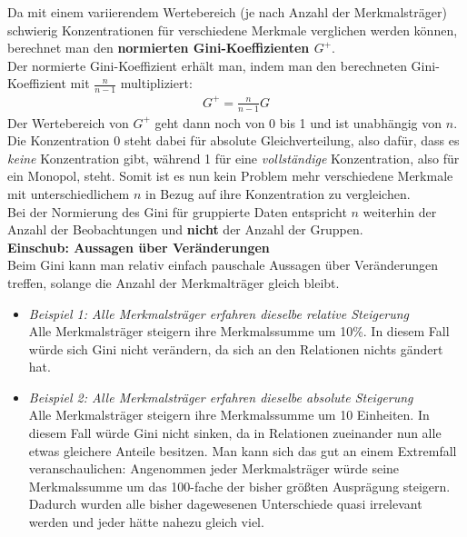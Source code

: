 \documentclass[a4paper]{article}
\newcommand\dangersign{%
 \makebox[1.8em][c]{%
 \makebox[0pt][c]{\raisebox{.15em}{\small!}}%
 \makebox[0pt][c]{\color{red}\Large$\triangle$}}}%
\begin{document}
\noindent Da mit einem variierendem Wertebereich (je nach Anzahl der Merkmalsträger) schwierig Konzentrationen für verschiedene Merkmale verglichen werden können, berechnet man den \textbf{normierten Gini-Koeffizienten $G^+$}.\\
Der normierte Gini-Koeffizient erhält man, indem man den berechneten Gini-Koeffizient mit $\frac{n}{n-1}$ multipliziert:
\begin{align*}
    G^+=\frac{n}{n-1}G
\end{align*}
Der Wertebereich von $G^+$ geht dann noch von 0 bis 1 und ist unabhängig von $n$. Die Konzentration 0 steht dabei für absolute Gleichverteilung, also dafür, dass es \textit{keine} Konzentration gibt, während 1 für eine \textit{vollständige} Konzentration, also für ein Monopol, steht. Somit ist es nun kein Problem mehr verschiedene Merkmale mit unterschiedlichem $n$ in Bezug auf ihre Konzentration zu vergleichen.\\

\noindent \dangersign Bei der Normierung des Gini für gruppierte Daten entspricht $n$ weiterhin der Anzahl der Beobachtungen und \textbf{nicht} der Anzahl der Gruppen.\\

\noindent \textbf{Einschub: Aussagen über Veränderungen}\\
Beim Gini kann man relativ einfach pauschale Aussagen über Veränderungen treffen, solange die Anzahl der Merkmalträger gleich bleibt.
\begin{itemize}
    \item \textit{Beispiel 1: Alle Merkmalsträger erfahren dieselbe relative Steigerung}\\
    Alle Merkmalsträger steigern ihre Merkmalssumme um 10\%. In diesem Fall würde sich Gini nicht verändern, da sich an den Relationen nichts gändert hat.
    \item \textit{Beispiel 2: Alle Merkmalsträger erfahren dieselbe absolute Steigerung}\\
    Alle Merkmalsträger steigern ihre Merkmalssumme um 10 Einheiten. In diesem Fall würde Gini nicht sinken, da in Relationen zueinander nun alle etwas gleichere Anteile besitzen. Man kann sich das gut an einem Extremfall veranschaulichen: Angenommen jeder Merkmalsträger würde seine Merkmalssumme um das 100-fache der bisher größten Ausprägung steigern. Dadurch wurden alle bisher dagewesenen Unterschiede quasi irrelevant werden und jeder hätte nahezu gleich viel. 
\end{itemize}
\end{document}

